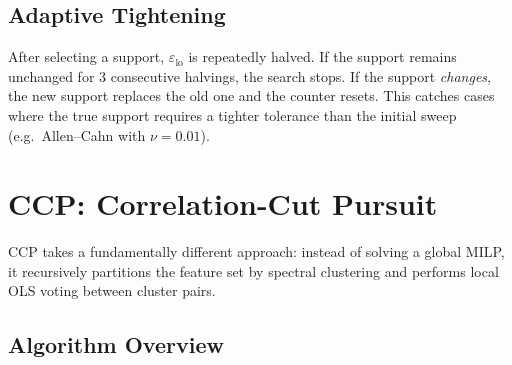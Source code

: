 \documentclass[11pt]{article}
\begin{document}
\subsection{Adaptive Tightening}

After selecting a support, $\varepsilon_{\text{lo}}$ is repeatedly halved.
If the support remains unchanged for 3 consecutive halvings, the search stops.
If the support \emph{changes}, the new support replaces the old one and the
counter resets. This catches cases where the true support requires a tighter
tolerance than the initial sweep (e.g.\ Allen--Cahn with $\nu = 0.01$).

\section{CCP: Correlation-Cut Pursuit}

CCP takes a fundamentally different approach: instead of solving a global
MILP, it recursively partitions the feature set by spectral clustering and
performs local OLS voting between cluster pairs.

\subsection{Algorithm Overview}
\end{document}
